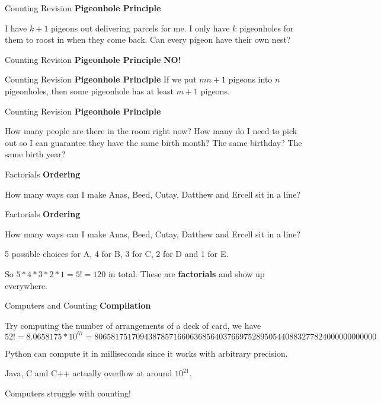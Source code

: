 \documentclass{beamer}
\begin{document}
\begin{frame}{Counting Revision}
    \textbf{Pigeonhole Principle}
    
        I have $k+1$ pigeons out delivering parcels for me. I only have $k$ pigeonholes for them to roost in when they come back. Can every pigeon have their own nest?
\end{frame}

\begin{frame}{Counting Revision}
    \textbf{Pigeonhole Principle}
        \textbf{NO!}
\end{frame}

\begin{frame}{Counting Revision}
    \textbf{Pigeonhole Principle}
        If we put $mn + 1$ pigeons into $n$ pigeonholes, then some pigeonhole has at least $m + 1$ pigeons.
\end{frame}

\begin{frame}{Counting Revision}
    \textbf{Pigeonhole Principle}

        How many people are there in the room right now? How many do I need to pick out so I can guarantee they have the same birth month? The same birthday? The same birth year?
\end{frame}


\begin{frame}{Factorials}
    \textbf{Ordering}
    
        How many ways can I make Anas, Beed, Cutay, Datthew and Ercell sit in a line?
\end{frame}

\begin{frame}{Factorials}
    \textbf{Ordering}
    
        How many ways can I make Anas, Beed, Cutay, Datthew and Ercell sit in a line?

        5 possible choices for A, 4 for B, 3 for C, 2 for D and 1 for E. 

        So $5*4*3*2*1 = 5! = 120$ in total. These are \textbf{factorials} and show up everywhere.
\end{frame}


\begin{frame}{Computers and Counting}
    \textbf{Compilation}
    
        Try computing the number of arrangements of a deck of card, we have $$52! = 8.0658175 * 10^{67} = 80658175170943878571660636856403766975289505440883277824000000000000$$

        Python can compute it in milliseconds since it works with arbitrary precision.

        Java, C and C++ actually overflow at around $10^{21}$. 

        Computers struggle with counting!
\end{frame}
\end{document}
